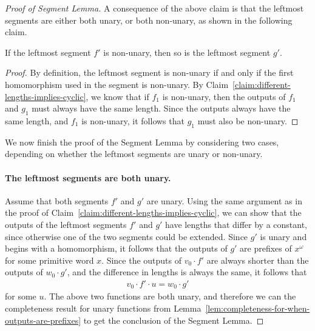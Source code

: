 \begin{proof}[Proof of Segment Lemma]
A consequence of the above claim is that the leftmost segments are either both unary, or both non-unary, as shown in the following claim.

\begin{claim}\label{claim:first-segments-are-both-cyclic-or-both-non-cyclic}
    If the  leftmost segment $f'$ is non-unary, then so is the leftmost segment $g'$. 
\end{claim}
\begin{proof}
    By definition, the leftmost segment is non-unary if and only if the first homomorphism used in the segment is non-unary. 
    By Claim~\ref{claim:different-lengths-implies-cyclic}, we know that if $f_1$ is non-unary, then the outputs of $f_1$ and $g_1$ must always have the same length.  Since the outputs always have the same length, and $f_1$ is non-unary, it follows that $g_1$ must also be non-unary. 
\end{proof}

We now finish the proof of the Segment Lemma by considering two cases, depending on whether the leftmost segments are unary or non-unary.

\paragraph*{The leftmost segments are both unary.}  Assume that both segments $f'$ and $g'$ are unary. 
 Using the same argument as in the proof of Claim~\ref{claim:different-lengths-implies-cyclic}, we can show that the outputs of the leftmost segments $f'$ and $g'$ have lengths that differ by a constant, since otherwise one of the two segments could be extended. Since $g'$ is unary and begins with a homomorphism, it follows that the outputs of $g'$ are prefixes of $x^\omega$ for some primitive word $x$.  
 Since the outputs of $v_0 \cdot f'$ are always shorter than the outputs of $w_0 \cdot g'$, and the difference in lengths is always the same, it follows that   
 \begin{align}\label{eq:cyclic-segments-conjugacy}
 v_0  \cdot f' \cdot u = w_0 \cdot g' 
 \end{align}
for some $u$. The above two functions are both unary, and therefore we can the completeness result for unary functions from  Lemma~\ref{lem:completeness-for-when-outputs-are-prefixes} to get the conclusion of the Segment Lemma.



\end{proof}
